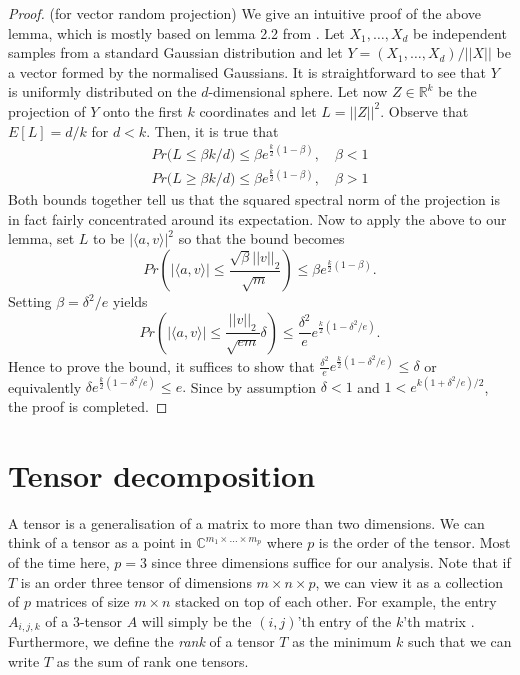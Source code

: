 \begin{proof} (for vector random projection)
    We give an intuitive proof of the above lemma, which is mostly based on lemma 2.2 from \cite{proofJLLemma}. Let $X_1,\ldots,X_d$ be independent samples from a standard Gaussian distribution and let $Y=(X_1,\ldots,X_d)/||X||$ be a vector formed by the normalised Gaussians. It is straightforward to see that $Y$ is uniformly distributed on the $d$-dimensional sphere. Let now $Z\in\mathbb{R}^k$ be the projection of $Y$ onto the first $k$ coordinates and let $L=||Z||^2$. Observe that $E[L]=d/k$ for $d<k$. Then, it is true that 
    \begin{align}
        Pr\big(L\leq\beta k/d\big)\leq\beta e^{\frac{k}{2}(1-\beta)},\quad\beta<1\\
        Pr\big(L\geq\beta k/d\big)\leq\beta e^{\frac{k}{2}(1-\beta)},\quad\beta>1
    \end{align}
    Both bounds together tell us that the squared spectral norm of the projection is in fact fairly concentrated around its expectation. Now to apply the above to our lemma, set $L$ to be $|\langle a,v\rangle|^2$ so that the bound becomes $$Pr\left(|\langle a,v\rangle|\leq\frac{\sqrt{\beta}||v||_2}{\sqrt{m}}\right)\leq\beta e^{\frac{k}{2}(1-\beta)}.$$
    Setting $\beta=\delta^2/e$ yields 
    $$Pr\left(|\langle a,v\rangle|\leq\frac{||v||_2}{\sqrt{em}}\delta\right)\leq\frac{\delta^2}{e}e^{\frac{k}{2}(1-\delta^2/e)}.$$
    Hence to prove the bound, it suffices to show that 
    $\frac{\delta^2}{e}e^{\frac{k}{2}(1-\delta^2/e)}\leq\delta$ or equivalently $\delta e^{\frac{k}{2}(1-\delta^2/e)}\leq e.$
    Since by assumption $\delta<1$ and $1<e^{k(1+\delta^2/e)/2}$, the proof is completed.
\end{proof}

\section{Tensor decomposition}
A tensor is a generalisation of a matrix to more than two dimensions. We can think of a tensor as a point in $\mathbb{C}^{m_1\times\ldots\times m_p}$ where $p$ is the order of the tensor. Most of the time here, $p=3$ since three dimensions suffice for our analysis. Note that if $T$ is an order three tensor of dimensions $m\times n\times p$, we can view it as a collection of $p$ matrices of size $m\times n$ stacked on top of each other. For example, the entry $A_{i,j,k}$ of a 3-tensor $A$ will simply be the $(i,j)$'th entry of the $k$'th matrix \cite{tensorMethods}. Furthermore, we define the \textit{rank} of a tensor $T$ as the minimum $k$ such that we can write $T$ as the sum of rank one tensors.

